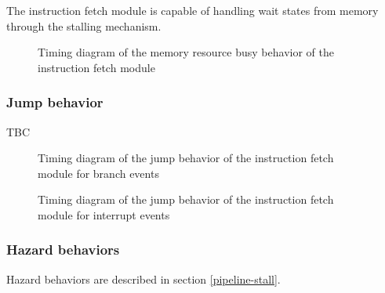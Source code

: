       \begin{content}
          The instruction fetch module is capable of handling wait states from memory through the stalling mechanism.
        \end{content}

      \begin{figure}[H]
          \centering
          
          \caption{Timing diagram of the memory resource busy behavior of the instruction fetch module}
          \label{fig:ifm-behavior-wait}
        \end{figure}

    \subsubsection{Jump behavior}

      \begin{content}
          TBC
        \end{content}

      \begin{figure}[H]
          \centering
          
          \caption{Timing diagram of the jump behavior of the instruction fetch module for branch events}
          \label{fig:ifm-behavior-branch}
        \end{figure}

      \begin{figure}[H]
          \centering
          
          \caption{Timing diagram of the jump behavior of the instruction fetch module for interrupt events}
          \label{fig:ifm-behavior-interrupt}
        \end{figure}

    \subsubsection{Hazard behaviors}

      \begin{content}
          Hazard behaviors are described in section \ref{pipeline-stall}.
        \end{content}

\newpage
